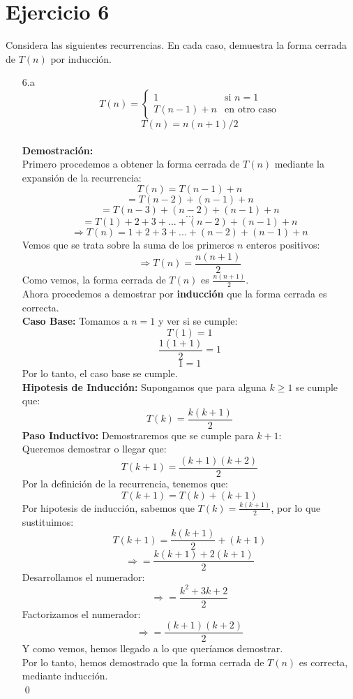 \documentclass[12pt]{article}
\begin{document}
\section*{Ejercicio 6}
Considera las siguientes recurrencias. En cada caso, demuestra la forma cerrada de $T(n)$ por inducción.
\begin{itemize}
    \item[6.a]
    \[
        T(n) = \left\{ \begin{array}{ll}
        1 & \text{si } n=1\\ T(n-1)+n & \text{en otro caso} \end{array}\right.
    \]
    \[
        T(n) = n(n+1)/2
    \]
    \\\textbf{Demostración:}\\
    Primero procedemos a obtener la forma cerrada de $T(n)$ mediante la expansión de la recurrencia:
    \[
        T(n) = T(n-1) + n
    \]
    \[
        = T(n-2) + (n-1) + n
    \]
    \[
        = T(n-3) + (n-2) + (n-1) + n
    \]
    \[
        ...
    \]
    \[
        = T(1) + 2 + 3 + ... + (n-2) + (n-1) + n
    \]
    \[
    \Rightarrow T(n) = 1 + 2 + 3 + ... + (n-2) + (n-1) + n
    \]
    Vemos que se trata sobre la suma de los primeros $n$ enteros positivos:
    \[
    \Rightarrow T(n) = \frac{n(n+1)}{2}
    \]
    Como vemos, la forma cerrada de $T(n)$ es $\frac{n(n+1)}{2}$.\\
    Ahora procedemos a demostrar por \textbf{inducción} que la forma cerrada es correcta.\\
    \textbf{Caso Base:} Tomamos a $n = 1$ y ver si se cumple:
    \[
        T(1) = 1
    \]
    \[
        \frac{1(1+1)}{2} = 1
    \]
    \[
        1 = 1
    \]
    Por lo tanto, el caso base se cumple.\\
    \textbf{Hipotesis de Inducción:} Supongamos que para alguna $k \geq 1$ se cumple que:
    \[
        T(k) = \frac{k(k+1)}{2}
    \]
    \textbf{Paso Inductivo:} Demostraremos que se cumple para $k + 1$:\\
    Queremos demostrar o llegar que:
    \[
        T(k+1) = \frac{(k+1)(k+2)}{2}
    \]
    Por la definición de la recurrencia, tenemos que:
    \[
        T(k+1) = T(k) + (k + 1)
    \]
    Por hipotesis de inducción, sabemos que $T(k) = \frac{k(k+1)}{2}$, por lo que sustituimos:
    \[
        T(k+1) = \frac{k(k+1)}{2} + (k + 1)
    \]
    \[
        \Rightarrow = \frac{k(k+1)+2(k + 1)}{2}
    \]
    Desarrollamos el numerador:
    \[
        \Rightarrow = \frac{k^2 + 3k + 2}{2}
    \]
    Factorizamos el numerador:
    \[
        \Rightarrow = \frac{(k+1)(k+2)}{2}
    \]
    Y como vemos, hemos llegado a lo que queríamos demostrar.\\
    Por lo tanto, hemos demostrado que la forma cerrada de $T(n)$ es correcta, mediante inducción.\\
    \qed



\end{itemize}
\end{document}
